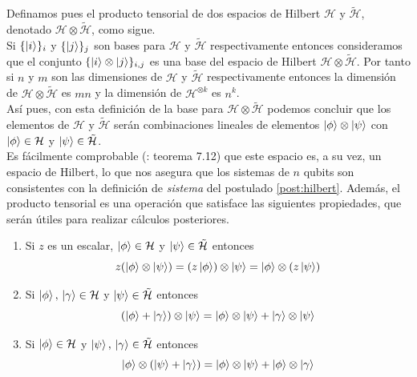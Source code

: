 \documentclass[11pt, spanish]{report}
\numberwithin{equation}{section}
\numberwithin{defin}{section}
\begin{document}
Definamos pues el producto tensorial de dos espacios de Hilbert $\mathcal{H}$ y $\tilde{\mathcal{H}}$, denotado $\mathcal{H}\otimes \tilde{\mathcal{H}}$, como sigue.\\

Si $\{\ket{i}\}_{i}$ y $\{\ket{j}\}_{j}$ son bases para $\mathcal{H}$ y $\tilde{\mathcal{H}}$ respectivamente entonces consideramos que el conjunto $\{\ket{i}\otimes\ket{j}\}_{i,j}$ es una base del espacio de Hilbert $\mathcal{H}\otimes \tilde{\mathcal{H}}$. Por tanto si $n$ y $m$ son las dimensiones de $\mathcal{H}$ y $\tilde{\mathcal{H}}$ respectivamente entonces la dimensión de $\mathcal{H}\otimes \tilde{\mathcal{H}}$ es $mn$ y la dimensión de $\mathcal{H}^{\otimes k}$ es $n^k$.\\

Así pues, con esta definición de la base para $\mathcal{H}\otimes \tilde{\mathcal{H}}$ podemos concluir que los elementos de $\mathcal{H}$ y $\tilde{\mathcal{H}}$ serán combinaciones lineales de elementos $\ket{\phi}\otimes\ket{\psi}$ con $\ket{\phi}\in\mathcal{H}$ y $\ket{\psi}\in\tilde{\mathcal{H}}$.\\

Es fácilmente comprobable (\cite{book:145343}: teorema 7.12) que este espacio es, a su vez, un espacio de Hilbert, lo que nos asegura que los sistemas de $n$ qubits son consistentes con la definición de \emph{sistema }del postulado \ref{post:hilbert}. Además, el producto tensorial es una operación que satisface las siguientes propiedades, que serán útiles para realizar cálculos posteriores.\\

\begin{enumerate}
\item Si $z$ es un escalar, $\ket{\phi}\in \mathcal{H}$ y $\ket{\psi}\in\tilde{\mathcal{H}}$ entonces
\begin{equation}
z(\ket{\phi}\otimes\ket{\psi})=(z\ket{\phi})\otimes\ket{\psi}=\ket{\phi}\otimes(z\ket{\psi})
\end{equation}

\item Si $\ket{\phi},\,\ket{\gamma} \in \mathcal{H}$ y $\ket{\psi}\in\tilde{\mathcal{H}}$ entonces
\begin{equation}
(\ket{\phi}+\ket{\gamma})\otimes\ket{\psi}=\ket{\phi}\otimes\ket{\psi}+\ket{\gamma}\otimes\ket{\psi}
\end{equation}

\item Si $\ket{\phi}\in \mathcal{H}$ y $\ket{\psi},\,\ket{\gamma}\in\tilde{\mathcal{H}}$ entonces
\begin{equation}
\ket{\phi}\otimes(\ket{\psi}+\ket{\gamma})=\ket{\phi}\otimes\ket{\psi}+\ket{\phi}\otimes\ket{\gamma}
\end{equation}
\end{enumerate}
\end{document}
